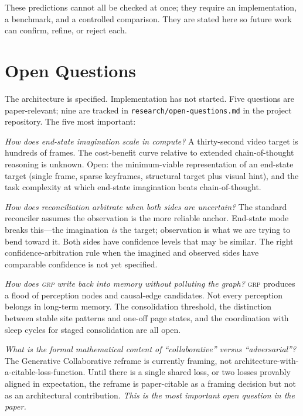 \documentclass[12pt]{article}
\theoremstyle{definition}
\theoremstyle{remark}
\newcommand{\grp}{\textsc{grp}}
\begin{document}
These predictions cannot all be checked at once; they require an
implementation, a benchmark, and a controlled comparison. They are
stated here so future work can confirm, refine, or reject each.

\section{Open Questions}
\label{sec:open}

The architecture is specified. Implementation has not started. Five
questions are paper-relevant; nine are tracked in
\texttt{research/open-questions.md} in the project repository. The
five most important:

\begin{description}[leftmargin=*]
\item[\textbf{Q1.}] \emph{How does end-state imagination scale in
  compute?} A thirty-second video target is hundreds of frames. The
  cost-benefit curve relative to extended chain-of-thought reasoning
  is unknown. Open: the minimum-viable representation of an end-state
  target (single frame, sparse keyframes, structural target plus
  visual hint), and the task complexity at which end-state imagination
  beats chain-of-thought.

\item[\textbf{Q2.}] \emph{How does reconciliation arbitrate when both
  sides are uncertain?} The standard reconciler assumes the observation
  is the more reliable anchor. End-state mode breaks this---the
  imagination \emph{is} the target; observation is what we are trying
  to bend toward it. Both sides have confidence levels that may be
  similar. The right confidence-arbitration rule when the imagined and
  observed sides have comparable confidence is not yet specified.

\item[\textbf{Q3.}] \emph{How does \grp{} write back into memory
  without polluting the graph?} \grp{} produces a flood of perception
  nodes and causal-edge candidates. Not every perception belongs in
  long-term memory. The consolidation threshold, the distinction
  between stable site patterns and one-off page states, and the
  coordination with sleep cycles for staged consolidation are all
  open.

\item[\textbf{Q4.}] \emph{What is the formal mathematical content of
  ``collaborative'' versus ``adversarial''?} The Generative
  Collaborative reframe is currently framing, not architecture-with-a-citable-loss-function.
  Until there is a single shared loss, or two losses provably aligned
  in expectation, the reframe is paper-citable as a framing decision
  but not as an architectural contribution. \emph{This is the most
  important open question in the paper.}


\end{description}
\end{document}
